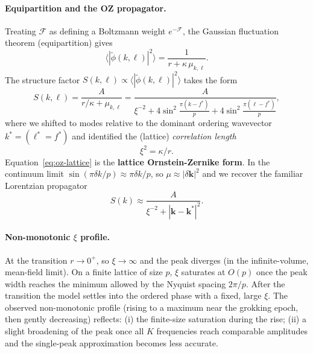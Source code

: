 \documentclass[11pt]{article}
\begin{document}
\paragraph{Equipartition and the OZ propagator.}
Treating $\mathcal{F}$ as defining a Boltzmann weight
$e^{-\mathcal{F}}$, the Gaussian fluctuation theorem (equipartition) gives
\begin{equation}
    \bigl\langle|\tilde\phi(k,\ell)|^2\bigr\rangle
    = \frac{1}{r + \kappa\,\mu_{k,\ell}}.
\end{equation}
The structure factor $S(k,\ell)\propto
\langle|\tilde\phi(k,\ell)|^2\rangle$ takes the form
\begin{equation}
    S(k,\ell)
    = \frac{A}{r/\kappa + \mu_{k,\ell}}
    = \frac{A}{\xi^{-2}
        + 4\sin^2\!\tfrac{\pi(k-f^*)}{p}
        + 4\sin^2\!\tfrac{\pi(\ell-f^*)}{p}},
    \label{eq:oz-lattice}
\end{equation}
where we shifted to modes relative to the dominant ordering wavevector
$k^*=(\ell^*=f^*)$ and identified the (lattice) \emph{correlation length}
\begin{equation}
    \xi^2 = \kappa/r.
\end{equation}
Equation~\eqref{eq:oz-lattice} is the \textbf{lattice Ornstein-Zernike form}.
In the continuum limit $\sin(\pi\delta k/p)\approx\pi\delta k/p$, so
$\mu\approx|\delta\mathbf{k}|^2$ and we recover the familiar
Lorentzian propagator
\begin{equation}
    S(k) \approx \frac{A}{\xi^{-2} + |\mathbf{k}-\mathbf{k}^*|^2}.
\end{equation}

\paragraph{Non-monotonic $\xi$ profile.}
At the transition $r\to 0^+$, so $\xi\to\infty$ and the peak diverges
(in the infinite-volume, mean-field limit).
On a finite lattice of size $p$, $\xi$ saturates at $O(p)$ once the peak
width reaches the minimum allowed by the Nyquist spacing $2\pi/p$.
After the transition the model settles into the ordered phase with a fixed,
large $\xi$.
The observed non-monotonic profile (rising to a maximum near the grokking
epoch, then gently decreasing) reflects: (i) the finite-size saturation
during the rise; (ii) a slight broadening of the peak once all $K$
frequencies reach comparable amplitudes and
the single-peak approximation becomes less accurate.

\end{document}
